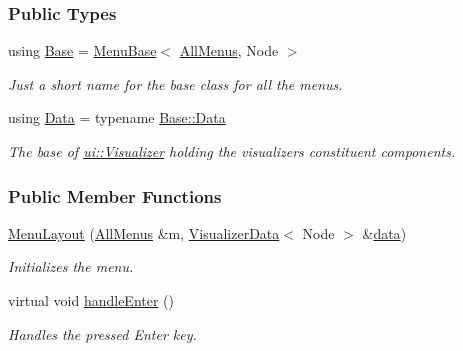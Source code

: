\subsubsection*{Public Types}
\begin{DoxyCompactItemize}
\item 
using \hyperlink{structslb_1_1core_1_1ui_1_1MenuLayout_af9bb37f9ebbc68c3c8390d283b9ae9b1}{Base} = \hyperlink{structslb_1_1core_1_1ui_1_1MenuBase}{Menu\+Base}$<$ \hyperlink{structslb_1_1core_1_1ui_1_1AllMenus}{All\+Menus}, Node $>$\hypertarget{structslb_1_1core_1_1ui_1_1MenuLayout_af9bb37f9ebbc68c3c8390d283b9ae9b1}{}\label{structslb_1_1core_1_1ui_1_1MenuLayout_af9bb37f9ebbc68c3c8390d283b9ae9b1}

\begin{DoxyCompactList}\small\item\em Just a short name for the base class for all the menus. \end{DoxyCompactList}\item 
using \hyperlink{structslb_1_1core_1_1ui_1_1MenuLayout_af4ada5179398cdd200805538f795c8f6}{Data} = typename \hyperlink{structslb_1_1core_1_1ui_1_1MenuBase_a1803444111552d2e5b87671292dd74cb}{Base\+::\+Data}\hypertarget{structslb_1_1core_1_1ui_1_1MenuLayout_af4ada5179398cdd200805538f795c8f6}{}\label{structslb_1_1core_1_1ui_1_1MenuLayout_af4ada5179398cdd200805538f795c8f6}

\begin{DoxyCompactList}\small\item\em The base of \hyperlink{structslb_1_1core_1_1ui_1_1Visualizer}{ui\+::\+Visualizer} holding the visualizer\textquotesingle{}s constituent components. \end{DoxyCompactList}\end{DoxyCompactItemize}
\subsubsection*{Public Member Functions}
\begin{DoxyCompactItemize}
\item 
\hyperlink{structslb_1_1core_1_1ui_1_1MenuLayout_ae8e2e66dfad5bd5c0523c40299140649}{Menu\+Layout} (\hyperlink{structslb_1_1core_1_1ui_1_1AllMenus}{All\+Menus} \&m, \hyperlink{structslb_1_1core_1_1ui_1_1VisualizerData}{Visualizer\+Data}$<$ Node $>$ \&\hyperlink{structslb_1_1core_1_1ui_1_1MenuBase_a475d9457affb2b4fc96737e269d6911f}{data})
\begin{DoxyCompactList}\small\item\em Initializes the menu. \end{DoxyCompactList}\item 
virtual void \hyperlink{structslb_1_1core_1_1ui_1_1MenuLayout_a9b2a46a964f49dd8102f3d055e18a1c6}{handle\+Enter} ()\hypertarget{structslb_1_1core_1_1ui_1_1MenuLayout_a9b2a46a964f49dd8102f3d055e18a1c6}{}\label{structslb_1_1core_1_1ui_1_1MenuLayout_a9b2a46a964f49dd8102f3d055e18a1c6}

\begin{DoxyCompactList}\small\item\em Handles the pressed Enter key. \end{DoxyCompactList}\end{DoxyCompactItemize}
